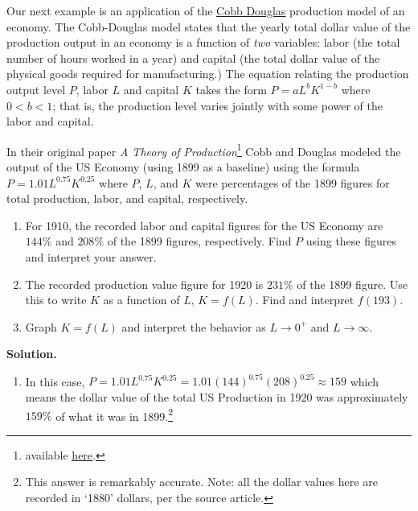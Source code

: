 \documentclass{ximera}
\begin{document}
 Our next example is an application of the  \href{https://en.wikipedia.org/wiki/Cobb-Douglas_production_function}{\underline{Cobb Douglas}} production model of an economy.  The Cobb-Douglas model states that the yearly total dollar value of the production output in an economy is a function of \textit{two} variables:   labor (the total number of hours worked in a year) and capital (the total dollar value of the physical goods required for manufacturing.) The equation relating the production output level $P$, labor $L$ and capital $K$ takes the form $P = a L^{b} K^{1-b}$ where $0 < b < 1$; that is, the production level varies jointly with some power of the labor and capital.  

\begin{ex} \label{CobbDouglasEx}  In their original paper \textit{A Theory of Production}\footnote{available \href{http://bit.ly/2dxlstt}{\underline{here}}.} Cobb and Douglas modeled the output of the US Economy (using 1899 as a baseline) using the formula $P = 1.01 L^{0.75} K^{0.25}$ where $P$, $L$, and $K$ were percentages of the 1899 figures for total production, labor, and capital, respectively.

\begin{enumerate}

\item  For 1910, the recorded labor and capital figures for the US Economy are $144 \%$ and $208 \%$ of the 1899 figures, respectively.  Find $P$ using these figures and interpret your answer.

\item  The recorded production value figure for 1920 is $231 \%$ of the 1899 figure.  Use this to write $K$ as a function of $L$, $K = f(L)$.  Find and interpret $f(193)$.

\item  Graph $K = f(L)$ and interpret the behavior as $L \rightarrow 0^{+}$ and $L \rightarrow \infty$.


\end{enumerate}

{\bf Solution.}

\begin{enumerate}

\item  In this case, $P = 1.01 L^{0.75} K^{0.25} = 1.01 (144)^{0.75} (208)^{0.25} \approx 159$ which means the dollar value of the total US Production in 1920 was approximately $159 \%$ of what it was in 1899.\footnote{This answer is remarkably accurate. Note:  all the dollar values here are recorded in `1880' dollars, per the source article. }  



\end{enumerate}
\end{ex}
\end{document}
